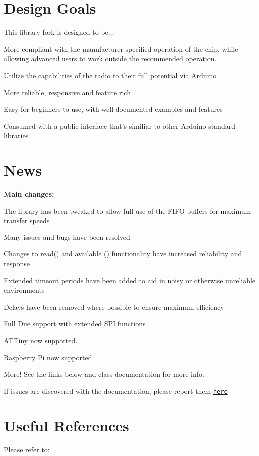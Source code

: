 \hypertarget{index_Goals}{}\section{Design Goals}\label{index_Goals}
This library fork is designed to be... \begin{DoxyItemize}
\item More compliant with the manufacturer specified operation of the chip, while allowing advanced users to work outside the recommended operation. \item Utilize the capabilities of the radio to their full potential via Arduino \item More reliable, responsive and feature rich \item Easy for beginners to use, with well documented examples and features \item Consumed with a public interface that's similiar to other Arduino standard libraries\end{DoxyItemize}
\hypertarget{index_News}{}\section{News}\label{index_News}
{\bfseries Main changes\+: }~\newline

\begin{DoxyItemize}
\item The library has been tweaked to allow full use of the F\+I\+F\+O buffers for maximum transfer speeds
\item Many issues and bugs have been resolved
\item Changes to read() and available () functionality have increased reliability and response
\item Extended timeout periods have been added to aid in noisy or otherwise unreliable environments
\item Delays have been removed where possible to ensure maximum efficiency
\item Full Due support with extended S\+P\+I functions
\item A\+T\+Tiny now supported.
\item Raspberry Pi now supported
\item More! See the links below and class documentation for more info.
\end{DoxyItemize}

If issues are discovered with the documentation, please report them \href{https://github.com/TMRh20/tmrh20.github.io/issues}{\tt here} \hypertarget{index_Useful}{}\section{Useful References}\label{index_Useful}
Please refer to\+:

